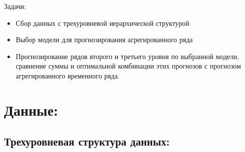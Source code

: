 \documentclass[c, dvipsnames]{beamer}  %
\begin{document}
\begin{frame}[shrink=3]
	\begin{block}{Задачи:}
	\begin{itemize}
		\item  Сбор данных с трехуровневой иерархической структурой 
		\item  Выбор модели для прогнозирования агрегированного ряда
		\item  Прогнозирование рядов второго и третьего уровня по выбранной модели, сравнение суммы и оптимальной комбинации этих прогнозов с прогнозом агрегированного временного ряда.  
	\end{itemize}
	
\end{block}
\end{frame}



\section{Данные: } 

\subsection{Трехуровневая структура данных:} 
\end{document}
